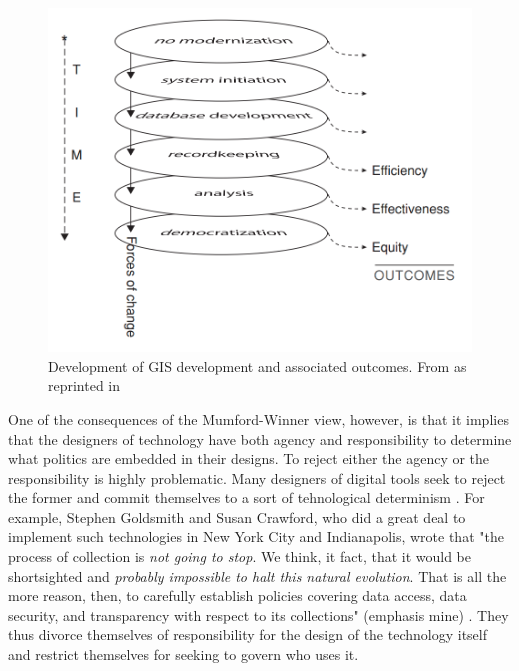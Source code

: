 \begin{figure}[h]
	\centering
	\includegraphics[scale=0.3]{Figures/chap2/gis_equity.png}
	\caption[Development of GIS development and associated outcomes]{Development of GIS development and associated outcomes. From \cite{tullochTheoreticalModelMultipurpose1999} as reprinted in \cite{tullochInstitutionalGeographicInformation2007}}
	\label{fig:gis_equity}
\end{figure}


One of the consequences of the Mumford-Winner view, however, is that it implies that the designers of technology have both agency and responsibility to determine what politics are embedded in their designs. To reject either the agency or the responsibility is highly problematic. Many designers of digital tools seek to reject the former and commit themselves to a sort of tehnological determinism \cite{sheppardGISSocietyResearch1995}. For example, Stephen Goldsmith and Susan Crawford, who did a great deal to implement such technologies in New York City and Indianapolis, wrote that "the process of collection is \textit{not going to stop}. We think, it fact, that it would be shortsighted and \textit{probably impossible to halt this natural evolution}. That is all the more reason, then, to carefully establish policies covering data access, data security, and transparency with respect to its collections" (emphasis mine) \cite{goldsmithResponsiveCityEngaging2014}. They thus divorce themselves of responsibility for the design of the technology itself and restrict themselves for seeking to govern who uses it. 

